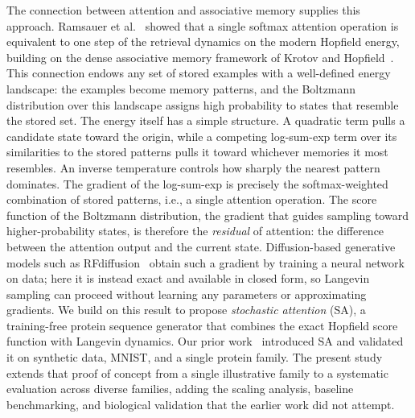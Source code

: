 The connection between attention and associative memory supplies this approach. Ramsauer et al.~\cite{ramsauerHopfieldNetworksAll2021} showed that a single softmax attention operation is equivalent to one step of the retrieval dynamics on the modern Hopfield energy, building on the dense associative memory framework of Krotov and Hopfield~\cite{krotovDenseAssociativeMemory2016}. This connection endows any set of stored examples with a well-defined energy landscape: the examples become memory patterns, and the Boltzmann distribution over this landscape assigns high probability to states that resemble the stored set. The energy itself has a simple structure. A quadratic term pulls a candidate state toward the origin, while a competing log-sum-exp term over its similarities to the stored patterns pulls it toward whichever memories it most resembles. An inverse temperature controls how sharply the nearest pattern dominates. The gradient of the log-sum-exp is precisely the softmax-weighted combination of stored patterns, i.e., a single attention operation. The score function of the Boltzmann distribution, the gradient that guides sampling toward higher-probability states, is therefore the \emph{residual} of attention: the difference between the attention output and the current state. Diffusion-based generative models such as RFdiffusion~\cite{watsonRFdiffusion2023} obtain such a gradient by training a neural network on data; here it is instead exact and available in closed form, so Langevin sampling can proceed without learning any parameters or approximating gradients. We build on this result to propose \emph{stochastic attention} (SA), a training-free protein sequence generator that combines the exact Hopfield score function with Langevin dynamics. Our prior work~\cite{alswaidanVarnerStochasticAttention2026} introduced SA and validated it on synthetic data, MNIST, and a single protein family. The present study extends that proof of concept from a single illustrative family to a systematic evaluation across diverse families, adding the scaling analysis, baseline benchmarking, and biological validation that the earlier work did not attempt.

